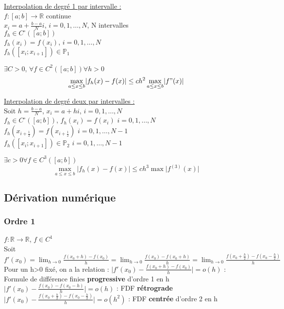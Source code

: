 \documentclass[../main.tex]{subfiles}
\begin{document}
\quad \underline{Interpolation de degré 1 par intervalle :}\\
$f:[a;b] \rightarrow \mathbb{R}$ continue\\
$x_i = a +\frac{b-a}{N} i $, $i=0,1,\dots, N$, N intervalles\\
$f_h\in C^{\circ}([a;b])$\\
$f_h(x_i)=f(x_i)$, $i=0,1, \dots, N$\\
$f_h([x_i; x_{i+1}])\in \mathbb{P}_1$\\

\begin{theorem}
$\exists C>0$, $\forall f \in C^2([a;b]) \forall h>0$\\
\begin{equation}
    \max_{a\leq x \leq b} \lvert f_h(x) - f(x) \rvert \leq ch^2 \max_{a\leq x\leq b} \lvert f"(x)\rvert
\end{equation}
\end{theorem}

\quad \underline{Interpolation de degré deux par intervalles :}\\
Soit $h= \frac{b-a}{N}$, $x_i = a+hi$, $i=0,1,\dots, N$\\
$f_h\in C^{\circ}([a;b])$, $f_h(x_i) = f(x_i)$ $i=0,1,\dots, N$\\
$f_h(x_{i+\frac{1}{2}}) = f(x_{i+\frac{1}{2}})$ $i=0,1,\dots, N-1$\\
$f_h([x_i;x_{i+1}]) \in \mathbb{P}_2$ $i=0,1,\dots, N-1$\\
\begin{theorem}
$\exists c>0 \forall f\in C^3([a;b])$\\
\begin{equation}
    \max_{a\leq x\leq b} \lvert f_h(x) - f(x)\rvert \leq ch^3 \max \lvert f^{(3)}(x)\rvert
\end{equation}
\end{theorem}

\subsection{Dérivation numérique}
\subsubsection{Ordre 1}
$f:\mathbb{R}\rightarrow \mathbb{R}$, $f\in C^1$\\
Soit $f'(x_0) = \lim_{h\rightarrow 0} \frac{f(x_0+h)-f(x_0)}{h} = \lim_{h\rightarrow 0} \frac{f(x_0)-f(x_0+h)}{h} = \lim_{h\rightarrow 0} \frac{f(x_0+\frac{h}{2})-f(x_0-\frac{h}{2})}{h}$\\
Pour un h>0 fixé, on a la relation : $\lvert f'(x_0)-\frac{f(x_0+h)-f(x_0)}{h}\rvert = o(h)$ : Formule de différence finies \textbf{progressive} d'ordre 1 en h\\
$\lvert f'(x_0)-\frac{f(x_0)-f(x_0-h)}{h}\rvert = o(h)$ : FDF \textbf{rétrograde}\\
$\lvert f'(x_0)-\frac{f(x_0+\frac{h}{2})-f(x_0-\frac{h}{2})}{h}\rvert = o(h^2)$ : FDF \textbf{centrée} d'ordre 2 en h\\
\end{document}
